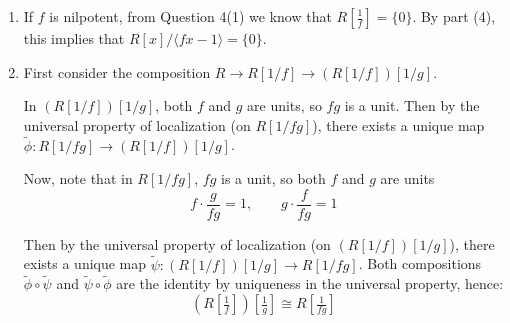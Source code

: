 \documentclass[Notebook.tex]{subfiles}
\begin{document}
\begin{solution}
\begin{enumerate}
		Now, since $\langle xf - 1\rangle = \ker(\eta)$ by the universal property of quotients we have the map $\widetilde{\eta}$, 

		\[
		\begin{tikzcd}[row sep = 3.5em, column sep = 3.5em]
		R \arrow[r, "\pi"] \arrow[d, swap, "\eta"] & R[x]/\langle fx-1\rangle \arrow[dl, dashed, "\tilde{\eta}"] \\
		R\left[\frac{1}{f}\right] & {}
		\end{tikzcd}
		\]

		Consider the following compositions:
		\begin{itemize}
			\item $\widetilde{\eta} \circ \widetilde{\phi}\left(\frac{r}{f^k}\right) = \widetilde{\eta}(rx^k) = \frac{r}{f^k}$  
			\item $\widetilde{\phi} \circ \widetilde{\eta}(rx^k) = \widetilde{\phi}\left(\frac{r}{f^k}\right) = rx^k$. 
		\end{itemize} 

		Thus $R\left[\frac{1}{f}\right] \iso R[x]/\langle fx-1\rangle$. 


		\item If $f$ is nilpotent, from Question 4(1) we know that $R\left[\frac{1}{f}\right] = \{0\}$. By part (4), this implies that $ R[x] / \langle fx - 1\rangle = \{0\}$. 
		
		\item First consider the composition $R \to R[1/f] \to (R[1/f])[1/g]$. 
		
		In $(R[1/f])[1/g]$, both $f$ and $g$ are units, so $fg$ is a unit. Then by the universal property of localization (on $R[1/fg]$), there exists a unique map $\widetilde{\phi}: R[1/fg] \to (R[1/f])[1/g]$.

		Now, note that in $R[1/fg]$, $fg$ is a unit, so both $f$ and $g$ are units 
		\[f \cdot \frac{g}{fg} = 1, \qquad g \cdot \frac{f}{fg} = 1\]
		
		Then by the universal property of localization (on $(R[1/f])[1/g]$), there exists a unique map $\widetilde{\psi}: (R[1/f])[1/g] \to R[1/fg]$. Both compositions $\widetilde{\phi} \circ \widetilde{\psi}$ and $\widetilde{\psi} \circ \widetilde{\phi}$ are the identity by uniqueness in the universal property, hence:
		\[
		\left(R\left[\tfrac{1}{f}\right]\right)\left[\tfrac{1}{g}\right] \cong R\left[\tfrac{1}{fg}\right] 
		\]
	\end{enumerate}
\end{solution}

\newpage 
\end{document}
